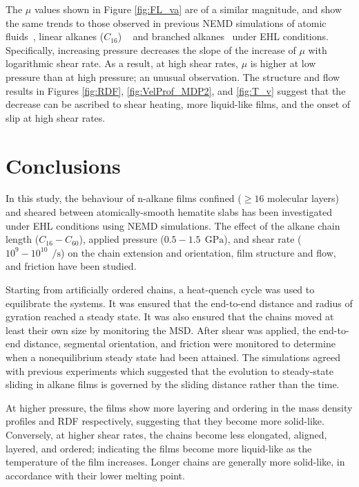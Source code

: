 \documentclass[5p]{elsarticle}
\begin{document}
The $\mu$ values shown in Figure \ref{fig:FL_va} are of a similar magnitude, and show the same trends to those observed in previous NEMD simulations of atomic fluids~\cite{Gattinoni2013}, linear alkanes ($C_{16}$) ~\cite{Ta2017} and branched alkanes~\cite{Ewen2017a} under EHL conditions. Specifically, increasing pressure decreases the slope of the increase of $\mu$ with logarithmic shear rate. As a result, at high shear rates, $\mu$ is higher at low pressure than at high pressure; an unusual observation. The structure and flow results in Figures \ref{fig:RDF}, \ref{fig:VelProf_MDP2}, and \ref{fig:T_v} suggest that the decrease can be ascribed to shear heating, more liquid-like films, and the onset of slip at high shear rates.


\section{Conclusions}
\label{sec:Conc}

In this study, the behaviour of n-alkane films confined ($\geq 16$ molecular layers) and sheared between atomically-smooth hematite slabs has been investigated under EHL conditions using NEMD simulations. The effect of the alkane chain length ($C_{16} - C_{60}$), applied pressure ($0.5 - 1.5~\SI{}{\giga\pascal}$), and shear rate ($10^{9} - 10^{10}~\SI{}{\per\second}$) on the chain extension and orientation, film structure and flow, and friction have been studied. 

Starting from artificially ordered chains, a heat-quench cycle was used to equilibrate the systems. It was ensured that the end-to-end distance and radius of gyration reached a steady state. It was also ensured that the chains moved at least their own size by monitoring the MSD. After shear was applied, the end-to-end distance, segmental orientation, and friction were monitored to determine when a nonequilibrium steady state had been attained. The simulations agreed with previous experiments which suggested that the evolution to steady-state sliding in alkane films is governed by the sliding distance rather than the time.

At higher pressure, the films show more layering and ordering in the mass density profiles and RDF respectively, suggesting that they become more solid-like. Conversely, at higher shear rates, the chains become less elongated, aligned, layered, and ordered; indicating the films become more liquid-like as the temperature of the film increases. Longer chains are generally more solid-like, in accordance with their lower melting point.
\end{document}
